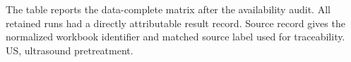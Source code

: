 \begin{flushleft}
\scriptsize The table reports the data-complete matrix after the availability audit. All retained runs had a directly attributable result record. Source record gives the normalized workbook identifier and matched source label used for traceability. US, ultrasound pretreatment.
\end{flushleft}
\endgroup
